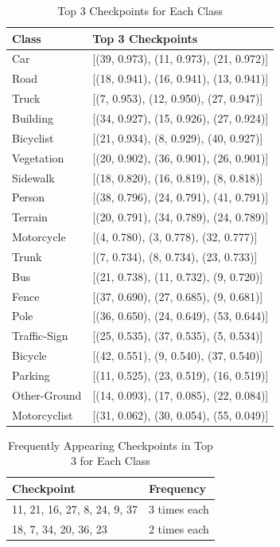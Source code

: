 \documentclass[10pt,twocolumn,letterpaper]{article}
\begin{document}
\begin{table}[!h]
\centering
\begin{tabular}{l l}
\hline
\textbf{Class} & \textbf{Top 3 Checkpoints} \\
\hline
Car & [(39, 0.973), (11, 0.973), (21, 0.972)] \\
Road & [(18, 0.941), (16, 0.941), (13, 0.941)] \\
Truck & [(7, 0.953), (12, 0.950), (27, 0.947)] \\
Building & [(34, 0.927), (15, 0.926), (27, 0.924)] \\
Bicyclist & [(21, 0.934), (8, 0.929), (40, 0.927)] \\
Vegetation & [(20, 0.902), (36, 0.901), (26, 0.901)] \\
Sidewalk & [(18, 0.820), (16, 0.819), (8, 0.818)] \\
Person & [(38, 0.796), (24, 0.791), (41, 0.791)] \\
Terrain & [(20, 0.791), (34, 0.789), (24, 0.789)] \\
Motorcycle & [(4, 0.780), (3, 0.778), (32, 0.777)] \\
Trunk & [(7, 0.734), (8, 0.734), (23, 0.733)] \\
Bus & [(21, 0.738), (11, 0.732), (9, 0.720)] \\
Fence & [(37, 0.690), (27, 0.685), (9, 0.681)] \\
Pole & [(36, 0.650), (24, 0.649), (53, 0.644)] \\
Traffic-Sign & [(25, 0.535), (37, 0.535), (5, 0.534)] \\
Bicycle & [(42, 0.551), (9, 0.540), (37, 0.540)] \\
Parking & [(11, 0.525), (23, 0.519), (16, 0.519)] \\
Other-Ground & [(14, 0.093), (17, 0.085), (22, 0.084)] \\
Motorcyclist & [(31, 0.062), (30, 0.054), (55, 0.049)] \\
\hline
\end{tabular}
\caption{Top 3 Checkpoints for Each Class}
\label{tab:top_checkpoints}
\end{table}

\begin{table}[!h]
\centering
\begin{tabular}{l l}
\hline
\textbf{Checkpoint} & \textbf{Frequency} \\
\hline
11, 21, 16, 27, 8, 24, 9, 37 & 3 times each \\
18, 7, 34, 20, 36, 23 & 2 times each \\
\hline
\end{tabular}
\caption{Frequently Appearing Checkpoints in Top 3 for Each Class}
\label{tab:frequent_checkpoints}
\end{table}
\end{document}
